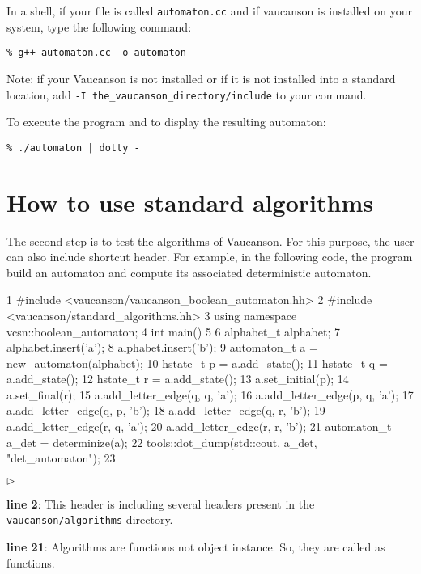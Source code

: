 \documentclass{article}
\begin{document}
In a shell, if your file is called \verb!automaton.cc! and
if vaucanson is installed on your system,
type the following command:

\begin{verbatim}
% g++ automaton.cc -o automaton
\end{verbatim}

Note: if your Vaucanson is not installed or if it is not installed
into a standard location, add \verb!-I the_vaucanson_directory/include!
to your command.

To execute the program and to display the resulting automaton:

\begin{verbatim}
% ./automaton | dotty -
\end{verbatim}

\section{How to use standard algorithms}

The second step is to test the algorithms of Vaucanson. For this
purpose, the user can also include shortcut header. For example, in
the following code, the program build an automaton and compute its
associated deterministic automaton.

\begin{code}
1  #include <vaucanson/vaucanson_boolean_automaton.hh>
2  #include <vaucanson/standard_algorithms.hh>
3  using namespace vcsn::boolean_automaton;
4  int main()
5  {
6    alphabet_t alphabet;
7    alphabet.insert('a');
8    alphabet.insert('b');
9    automaton_t a = new_automaton(alphabet);
10   hstate_t p = a.add_state();
11   hstate_t q = a.add_state();
12   hstate_t r = a.add_state();
13   a.set_initial(p);
14   a.set_final(r);
15   a.add_letter_edge(q, q, 'a');
16   a.add_letter_edge(p, q, 'a');
17   a.add_letter_edge(q, p, 'b');
18   a.add_letter_edge(q, r, 'b');
19   a.add_letter_edge(r, q, 'a');
20   a.add_letter_edge(r, r, 'b');
21   automaton_t a_det = determinize(a);
22   tools::dot_dump(std::cout, a_det, "det_automaton");
23 }
\end{code}

\begin{list}{$\triangleright$}{}
\item \textbf{line 2}: This header is including several headers present
in the \verb!vaucanson/algorithms! directory.
\item \textbf{line 21}: Algorithms are functions not object instance.
  So, they are called as functions.
\end{list}
\end{document}
